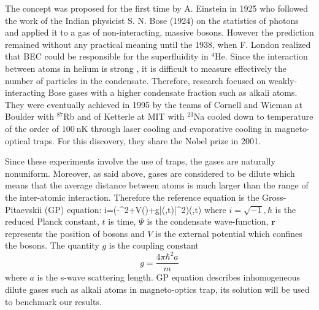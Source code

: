 The concept was proposed for the first time by A. Einstein in 1925 who followed the work of the Indian physicist S. N. Bose (1924) on the statistics of photons and applied it to a gas of non-interacting, massive bosons. However the prediction remained without any practical meaning until the 1938, when F. London realized that BEC could be responsible for the superfluidity in $^4$He. Since the interaction between  atoms in helium is strong \cite{pethick_smith_2008}, it is difficult to measure effectively the number of particles in the condensate. Therefore, research focused on weakly-interacting Bose gases with a higher condensate fraction such as alkali atoms. They were eventually achieved in 1995 by the teams of Cornell and Wieman at Boulder with $^{87}$Rb and of Ketterle at MIT with $^{23}$Na cooled down to temperature of the order of $100\ \si{\nano\kelvin}$ through laser cooling and evaporative cooling in magneto-optical traps. For this discovery, they share the Nobel prize in 2001. 


Since these experiments involve the use of traps, the gases are naturally nonuniform. Moreover, as said above, gases are considered to be dilute which means that the average distance between atoms is much larger than the range of the inter-atomic interaction. Therefore the reference equation is the Gross-Pitaevskii (GP) equation:
\beq
\label{GP}
i\hbar{}=\bigg(-\nabla^2+V()+g|\Psi(,t)|^2\bigg)\Psi(,t)
\eeq
where $i=\sqrt{-1}, \hbar$ is the reduced Planck constant, $t$ is time, $\Psi$ is the condensate wave-function, $\mathbf{r}$ represents the position of bosons and $V$ is the external potential which confines the bosons. The quantity $g$ is the coupling constant 
\begin{equation*}
	g=\frac{4\pi\hbar^2a}{m}
\end{equation*}
where $a$ is the s-wave scattering length. GP equation describes inhomogeneous dilute gases such as alkali atoms in magneto-optics trap, its solution will be used to benchmark our results.

